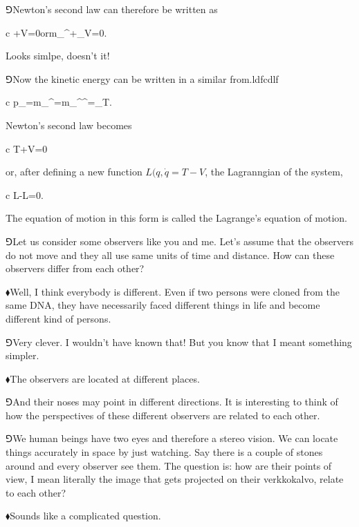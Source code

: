 \documentclass[10pt,oneside%
]{memoir}
\newenvironment{eqna}{\begin{IEEEeqnarray*}{c}}{\end{IEEEeqnarray*}\ignorespacesafterend}
\newcommand{\der}[2]{\frac{\dd#1}{\dd#2}}
\newcommand{\puoli}{\frac{1}{2}}
\newcommand{\orr}{\qquad\textrm{or}\qquad}
\newcommand{\dd}{\mathrm{d}}
\newcommand{\coa}{{\color{black}\bullet}}
\newcommand{\cob}{{\color{oranssi}\bullet}}
\newcommand{\hea}{\(\blacklozenge\)\;}
\newcommand{\heb}{\(\Game\)\;}
\begin{document}
\heb Newton's second law can therefore be written as
\begin{eqna}
    +\partial V=0\orr m_{\coa\cob}^\cob+\partial_\coa V=0.
\end{eqna}
Looks simlpe, doesn't it!

\heb Now the kinetic energy can be written in a similar from.ldfcdlf
\begin{eqna}
    p_\coa=m_{\coa\cob}^\coa=\puoli\dot{\partial}m_{\coa\cob}^\coa{}^\cob=\dot{\partial}_\coa T.
\end{eqna}
Newton's second law becomes
\begin{eqna}
    \der{}{t}\dot{\partial}T+\partial V=0
\end{eqna}
or, after defining a new function \(L(q,\dot{q}=T-V\), the Lagranngian of the system,
\begin{eqna}
    \der{}{t}\dot{\partial}L-\partial L=0.
\end{eqna}
The equation of motion in this form is called the Lagrange's equation of motion.







\newpage


\heb Let us consider some observers like you and me. Let's assume that the observers do not move and they all use same units of time and distance. How can these observers differ from each other?

\hea Well, I think everybody is different. Even if two persons were cloned from the same DNA, they have necessarily faced different things in life and become different kind of persons.

\heb Very clever. I wouldn't have known that! But you know that I meant something simpler.

\hea The observers are located at different places.

\heb And their noses may point in different directions. It is interesting to think of how the perspectives of these different observers are related to each other.

\heb We human beings have two eyes and therefore a stereo vision. We can locate things accurately in space by just watching. Say there is a couple of stones around and every observer see them. The question is: how are their points of view, I mean literally the image that gets projected on their verkkokalvo, relate to each other?

\hea Sounds like a complicated question.
\end{document}
